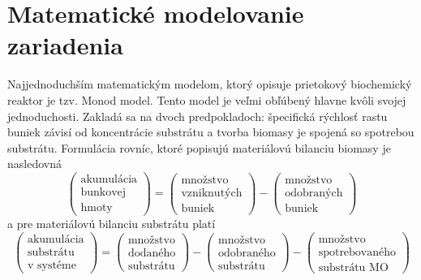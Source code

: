 \section{Matematické modelovanie zariadenia}
Najjednoduchším matematickým modelom, ktorý opisuje prietokový biochemický reaktor je tzv. Monod model. Tento model je veľmi obľúbený hlavne kvôli svojej jednoduchosti. Zakladá sa na dvoch predpokladoch:  špecifická rýchlosť rastu buniek závisí od koncentrácie substrátu a  tvorba biomasy je spojená so spotrebou substrátu. Formulácia rovníc, ktoré popisujú materiálovú bilanciu biomasy je nasledovná
\begin{equation*}
	\begin{pmatrix}
		\text{akumulácia}\\
		\text{bunkovej}\\
		\text{hmoty}
	\end{pmatrix} = 
	\begin{pmatrix}
		\text{množstvo}\\
		\text{vzniknutých}\\
		\text{buniek} 
	\end{pmatrix} -
	\begin{pmatrix}
		\text{množstvo}\\
		\text{odobraných}\\
		\text{buniek} 
	\end{pmatrix}
\end{equation*}
a pre materiálovú bilanciu substrátu platí
\begin{equation*}
	\begin{pmatrix}
		\text{akumulácia}\\
		\text{substrátu}\\
		\text{v systéme}
	\end{pmatrix} = 
	\begin{pmatrix}
		\text{množstvo}\\
		\text{dodaného}\\
		\text{substrátu} 
	\end{pmatrix} -
	\begin{pmatrix}
		\text{množstvo}\\
		\text{odobraného}\\
		\text{substrátu} 
	\end{pmatrix} -
	\begin{pmatrix}
		\text{množstvo}\\
		\text{spotrebovaného}\\
		\text{substrátu MO} 
	\end{pmatrix}
\end{equation*}
